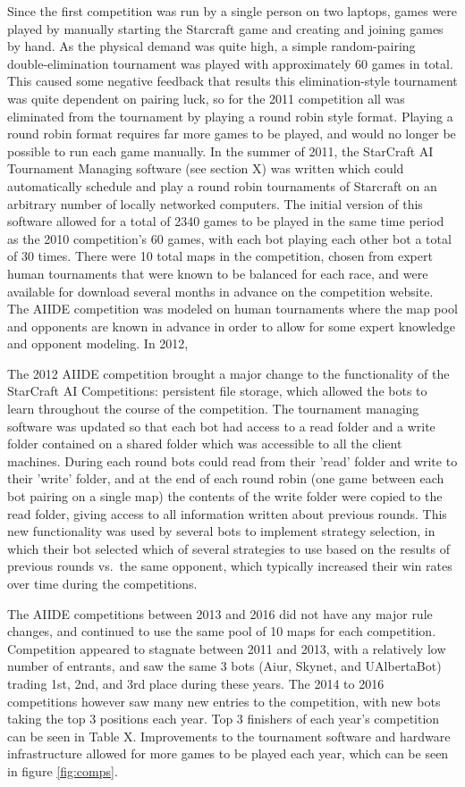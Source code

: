 Since the first competition was run by a single person on two laptops, games were played by manually starting the Starcraft game and creating and joining games by hand. As the physical demand was quite high, a simple random-pairing double-elimination tournament was played with approximately 60 games in total. This caused some negative feedback that results this elimination-style tournament was quite dependent on pairing luck, so for the 2011 competition all was eliminated from the tournament by playing a round robin style format. Playing a round robin format requires far more games to be played, and would no longer be possible to run each game manually. In the summer of 2011, the StarCraft AI Tournament Managing software (see section X) was written which could automatically schedule and play a round robin tournaments of Starcraft on an arbitrary number of locally networked computers. The initial version of this software allowed for a total of 2340 games to be played in the same time period as the 2010 competition's 60 games, with each bot playing each other bot a total of 30 times. There were 10 total maps in the competition, chosen from expert human tournaments that were known to be balanced for each race, and were available for download several months in advance on the competition website. The AIIDE competition was modeled on human tournaments where the map pool and opponents are known in advance in order to allow for some expert knowledge and opponent modeling. In 2012, 

The 2012 AIIDE competition brought a major change to the functionality of the StarCraft AI Competitions: persistent file storage, which allowed the bots to learn throughout the course of the competition. The tournament managing software was updated so that each bot had access to a read folder and a write folder contained on a shared folder which was accessible to all the client machines. During each round bots could read from their 'read' folder and write to their 'write' folder, and at the end of each round robin (one game between each bot pairing on a single map) the contents of the write folder were copied to the read folder, giving access to all information written about previous rounds. This new functionality was used by several bots to implement strategy selection, in which their bot selected which of several strategies to use based on the results of previous rounds vs.\ the same opponent, which typically increased their win rates over time during the competitions.

The AIIDE competitions between 2013 and 2016 did not have any major rule changes, and continued to use the same pool of 10 maps for each competition. Competition appeared to stagnate between 2011 and 2013, with a relatively low number of entrants, and saw the same 3 bots (Aiur, Skynet, and UAlbertaBot) trading 1st, 2nd, and 3rd place during these years. The 2014 to 2016 competitions however saw many new entries to the competition, with new bots taking the top 3 positions each year. Top 3 finishers of each year's competition can be seen in Table X. Improvements to the tournament software and hardware infrastructure allowed for more games to be played each year, which can be seen in figure \ref{fig:comps}.

